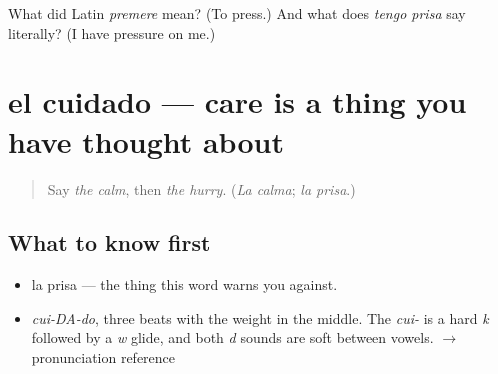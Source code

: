 \begin{tcolorbox}[breakable,colback=teal!4,colframe=teal!35!black,title={Before you move on}]
What did Latin \emph{premere} mean? (To press.) And what does \emph{tengo prisa} say literally? (I have pressure on me.)
\end{tcolorbox}
\section[el cuidado]{el cuidado — care is a thing you have thought about}

\label{lesson:ES-C333-cuidado}



\begin{quote}
Say \emph{the calm}, then \emph{the hurry}. (\emph{La calma}; \emph{la prisa}.)
\end{quote}

\subsection*{What to know first}
\begin{itemize}
\raggedright
  \item la prisa — the thing this word warns you against.
\end{itemize}

\begin{sounds}
\begin{itemize}
\raggedright
  \item \emph{cui-DA-do}, three beats with the weight in the middle. The \emph{cui-} is a hard \emph{k} followed by a \emph{w} glide, and both \emph{d} sounds are soft between vowels. $\to$ pronunciation reference
\end{itemize}
\end{sounds}

